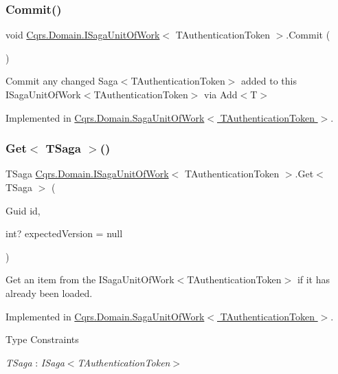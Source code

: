 \subsubsection{\texorpdfstring{Commit()}{Commit()}}
{\footnotesize\ttfamily void \hyperlink{interfaceCqrs_1_1Domain_1_1ISagaUnitOfWork}{Cqrs.\+Domain.\+I\+Saga\+Unit\+Of\+Work}$<$ T\+Authentication\+Token $>$.Commit (\begin{DoxyParamCaption}{ }\end{DoxyParamCaption})}



Commit any changed Saga$<$\+T\+Authentication\+Token$>$ added to this I\+Saga\+Unit\+Of\+Work$<$\+T\+Authentication\+Token$>$ via Add$<$\+T$>$ 



Implemented in \hyperlink{classCqrs_1_1Domain_1_1SagaUnitOfWork_aed2756dadfe0a0903a791944d02c4db8}{Cqrs.\+Domain.\+Saga\+Unit\+Of\+Work$<$ T\+Authentication\+Token $>$}.

\mbox{\label{interfaceCqrs_1_1Domain_1_1ISagaUnitOfWork_a4c4745fcebc42ba5c94647b22939809b}} 
\subsubsection{\texorpdfstring{Get$<$ T\+Saga $>$()}{Get< TSaga >()}}
{\footnotesize\ttfamily T\+Saga \hyperlink{interfaceCqrs_1_1Domain_1_1ISagaUnitOfWork}{Cqrs.\+Domain.\+I\+Saga\+Unit\+Of\+Work}$<$ T\+Authentication\+Token $>$.Get$<$ T\+Saga $>$ (\begin{DoxyParamCaption}\item[{Guid}]{id,  }\item[{int?}]{expected\+Version = {\ttfamily null} }\end{DoxyParamCaption})}



Get an item from the I\+Saga\+Unit\+Of\+Work$<$\+T\+Authentication\+Token$>$ if it has already been loaded. 



Implemented in \hyperlink{classCqrs_1_1Domain_1_1SagaUnitOfWork_acebe159e3b27e36a91909e97cf37d28d}{Cqrs.\+Domain.\+Saga\+Unit\+Of\+Work$<$ T\+Authentication\+Token $>$}.

\begin{Desc}
\item[Type Constraints]\begin{description}
\item[{\em T\+Saga} : {\em I\+Saga$<$T\+Authentication\+Token$>$}]\end{description}
\end{Desc}
